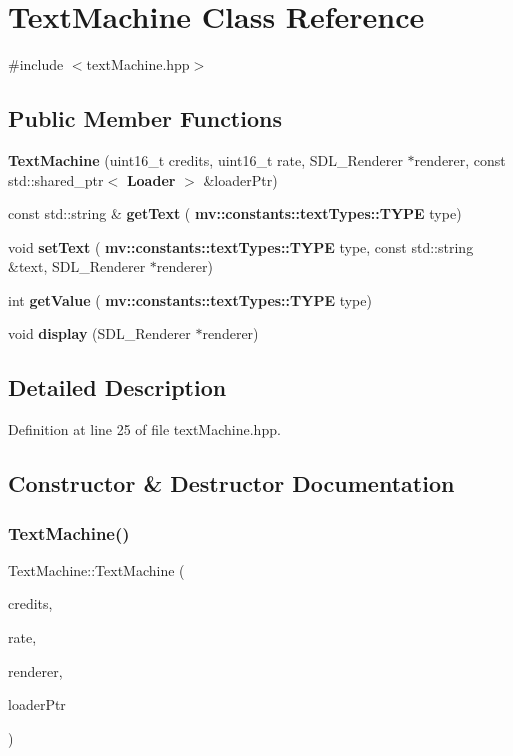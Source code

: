 \section{Text\+Machine Class Reference}
\label{class_text_machine}


{\ttfamily \#include $<$text\+Machine.\+hpp$>$}

\subsection*{Public Member Functions}
\begin{DoxyCompactItemize}
\item 
\textbf{ Text\+Machine} (uint16\+\_\+t credits, uint16\+\_\+t rate, S\+D\+L\+\_\+\+Renderer $\ast$renderer, const std\+::shared\+\_\+ptr$<$ \textbf{ Loader} $>$ \&loader\+Ptr)
\item 
const std\+::string \& \textbf{ get\+Text} (\textbf{ mv\+::constants\+::text\+Types\+::\+T\+Y\+PE} type)
\item 
void \textbf{ set\+Text} (\textbf{ mv\+::constants\+::text\+Types\+::\+T\+Y\+PE} type, const std\+::string \&text, S\+D\+L\+\_\+\+Renderer $\ast$renderer)
\item 
int \textbf{ get\+Value} (\textbf{ mv\+::constants\+::text\+Types\+::\+T\+Y\+PE} type)
\item 
void \textbf{ display} (S\+D\+L\+\_\+\+Renderer $\ast$renderer)
\end{DoxyCompactItemize}


\subsection{Detailed Description}


Definition at line 25 of file text\+Machine.\+hpp.



\subsection{Constructor \& Destructor Documentation}
\mbox{\label{class_text_machine_a0000a4df1493e06caaa18f2d96fd3286}} 
\subsubsection{Text\+Machine()}
{\footnotesize\ttfamily Text\+Machine\+::\+Text\+Machine (\begin{DoxyParamCaption}\item[{uint16\+\_\+t}]{credits,  }\item[{uint16\+\_\+t}]{rate,  }\item[{S\+D\+L\+\_\+\+Renderer $\ast$}]{renderer,  }\item[{const std\+::shared\+\_\+ptr$<$ \textbf{ Loader} $>$ \&}]{loader\+Ptr }\end{DoxyParamCaption})}



